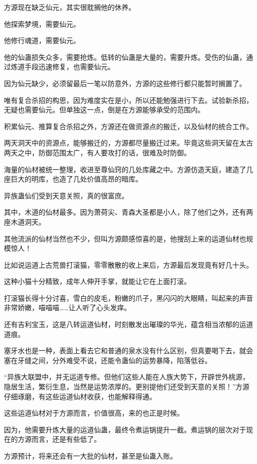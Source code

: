 \begin{this_body}
方源现在缺乏仙元，其实很耽搁他的休养。

他探索梦境，需要仙元。

他修行魂道，需要仙元。

他的仙蛊损失众多，需要抢炼。低转的仙蛊是大量的，需要升炼。受伤的仙蛊，通过炼道手段迅速修复，也需要仙元。

因为仙元缺少，必须留最后一笔以防意外，方源的这些修行都只能暂时搁置了。

唯有复合杀招的构思，因为难度实在是小，所以还能勉强进行下去。试验新杀招，无疑也需要仙元。但单独这一点，倒是在方源能够承受的范围内。

积累仙元、推算复合杀招之外，方源还在做资源点的搬迁，以及仙材的统合工作。

两天洞天中的资源点，能够搬迁的，方源都尽量搬迁过来。毕竟这些洞天留在太古两天之中，防御范围太广，有人要攻打的话，很难及时防御。

海量的仙材被统一整理，收进至尊仙窍的几处库藏之中。方源仿造天庭，建造了几座巨大的明库，也造了几处价值高昂的暗库。

异族蛊仙们受到天意关照，真的很富庶。

其中，木道的仙材最多。因为萧荷尖、青森大圣都是小人，除了他们之外，还有两座木道洞天。

其他流派的仙材当然也不少，但叫方源颇感惊喜的是，他搜刮上来的运道仙材也规模惊人！

比如说运道上古荒兽打滚猫，零零散散的收上来后，方源最后发现竟有好几十头。

这种小猫十分精致，成年人伸开手掌，就能让它在上面打滚。

打滚猫长得十分讨喜，雪白的皮毛，粉嫩的爪子，黑闪闪的大眼睛，叫起来的声音非常娇嫩，喵喵喵……让人听了心头发痒。

还有吉利宝玉，这是八转运道仙材，时刻散发出璀璨的华光，蕴含相当浓郁的运道道痕。

塞牙水也是一种，表面上看去它和普通的泉水没有什么区别，但真要喝下去，就会塞在牙缝之间，分外难受不说，还能令蛊仙的运势暴降，陷落低谷。

“异族大联盟中，并无运道专修。但他们这些人能在人族大势下，开辟世外桃源，隐居生活，繁衍生息，当然是运势浓厚的。更别提他们还受到天意的关照！”方源仔细琢磨，有这些运道仙材收获，也能解释得通。

这些运道仙材对于方源而言，价值很高，来的也正是时候。

因为，他需要升炼大量的运道仙蛊，最终令煮运锅提升一截。煮运锅的层次对于现在的方源而言，还是有些低了。

方源预计，将来还会有一大批的仙材，甚至是仙蛊入账。


\end{this_body}
